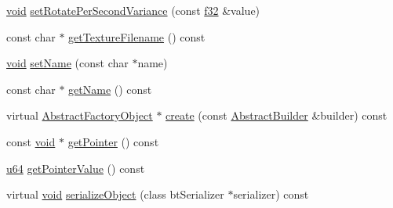\begin{DoxyCompactItemize}
\item 
\mbox{\hyperlink{_thread_8h_af1e856da2e658414cb2456cb6f7ebc66}{void}} \mbox{\hyperlink{classnjli_1_1_particle_emitter_a92f25b187a1c76822558cd65a8cf27b4}{set\+Rotate\+Per\+Second\+Variance}} (const \mbox{\hyperlink{_util_8h_a5f6906312a689f27d70e9d086649d3fd}{f32}} \&value)
\item 
const char $\ast$ \mbox{\hyperlink{classnjli_1_1_particle_emitter_a7c10baa951db09987e3282248d27de96}{get\+Texture\+Filename}} () const
\item 
\mbox{\hyperlink{_thread_8h_af1e856da2e658414cb2456cb6f7ebc66}{void}} \mbox{\hyperlink{classnjli_1_1_particle_emitter_a087eb5f8d9f51cc476f12f1d10a3cb95}{set\+Name}} (const char $\ast$name)
\item 
const char $\ast$ \mbox{\hyperlink{classnjli_1_1_particle_emitter_ad41266885be835f3ee602311e20877a4}{get\+Name}} () const
\item 
virtual \mbox{\hyperlink{classnjli_1_1_abstract_factory_object}{Abstract\+Factory\+Object}} $\ast$ \mbox{\hyperlink{classnjli_1_1_particle_emitter_a83a8876ae63b92804004cf3febe76573}{create}} (const \mbox{\hyperlink{classnjli_1_1_abstract_builder}{Abstract\+Builder}} \&builder) const
\item 
const \mbox{\hyperlink{_thread_8h_af1e856da2e658414cb2456cb6f7ebc66}{void}} $\ast$ \mbox{\hyperlink{classnjli_1_1_particle_emitter_ac4ca71716ed832be357f15f8262c8448}{get\+Pointer}} () const
\item 
\mbox{\hyperlink{_util_8h_ad758b7a5c3f18ed79d2fcd23d9f16357}{u64}} \mbox{\hyperlink{classnjli_1_1_particle_emitter_a4ffddf141a426a5a07d0ac19f1913811}{get\+Pointer\+Value}} () const
\item 
virtual \mbox{\hyperlink{_thread_8h_af1e856da2e658414cb2456cb6f7ebc66}{void}} \mbox{\hyperlink{classnjli_1_1_particle_emitter_a4fc4bcd9d1930911474210c047372fc0}{serialize\+Object}} (class bt\+Serializer $\ast$serializer) const
\end{DoxyCompactItemize}

